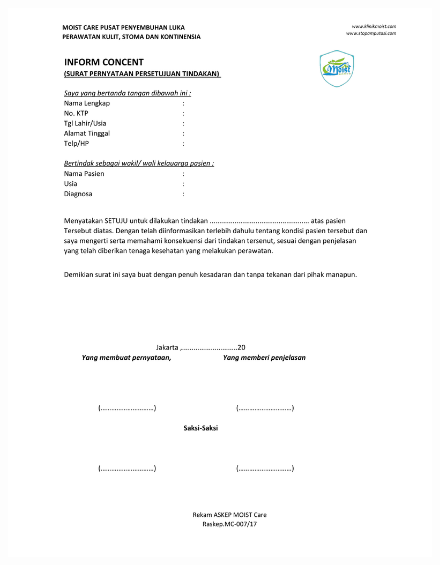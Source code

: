\begin{figure}[H]
	\centering
	\includegraphics[keepaspectratio, width=14cm]{gambar/Format_Pengkajian-2}
	\label{gambar:Format_Pengkajian_2}
\end{figure}


